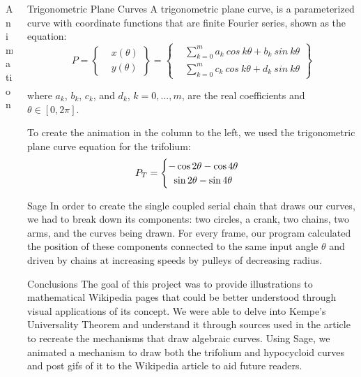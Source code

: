 \documentclass{beamer}
\begin{document}
\begin{frame}{}
\begin{columns}[t]
\begin{column}{0.3\linewidth}
\begin{block}{Animation}
\begin{center}
\end{center}

\end{block}
\end{column}%


\begin{column}{0.3\linewidth}

\begin{block}{Trigonometric Plane Curves}
A trigonometric plane curve, is a parameterized curve with coordinate functions that are finite Fourier series, shown as the equation: \\
\begin{equation*}
P =
\left\{\!\begin{aligned}
&x(\theta) \\[1ex]
&y(\theta)
\end{aligned}\right\}
=
\left\{\!\begin{aligned}
&\sum_{k=0}^{m} a_{k} \ cos \  k\theta + b_{k} \ sin  \ k\theta\\[1ex]
&\sum_{k=0}^{m} c_{k}  \ cos \ k\theta + d_{k} \ sin \  k\theta
\end{aligned}\right\}
\end{equation*}

where $a_{k}$, $b_{k}$, $c_{k}$, and $d_{k}$, $k=0,...,m$, are the real coefficients and $\theta \in [0,2\pi]$.

\vspace{2em}
To create the animation in the column to the left, we used the trigonometric plane curve equation for the trifolium:
\[
P_{T}=\begin{cases}
	\hfil -\cos{2\theta} - \cos{4\theta}\\
	\hfil \sin{2\theta} - \sin{4\theta}
	\end{cases}
\]

\end{block}

\begin{block}{Sage}
In order to create the single coupled serial chain that draws our curves, we had to break down its components: two circles, a crank, two chains, two arms, and the curves being drawn. For every frame, our program calculated the position of these components connected to the same input angle $\theta$ and driven by chains at increasing speeds by pulleys of decreasing radius.


\end{block}
\begin{block}{Conclusions}
The goal of this project was to provide illustrations to mathematical Wikipedia pages that could be better understood through visual applications of its concept. We were able to delve into Kempe's Universality Theorem and understand it through sources used in the article to recreate the mechanisms that draw algebraic curves. Using Sage, we animated a mechanism to draw both the trifolium and hypocycloid curves and post gifs of it to the Wikipedia article to aid future readers.
\end{block}


\end{column}
\end{columns}
\end{frame}
\end{document}
